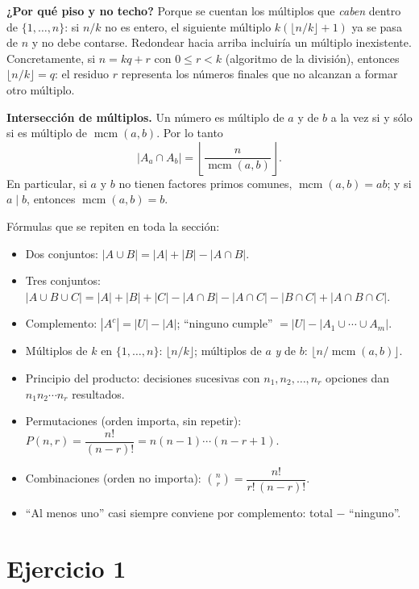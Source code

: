 \documentclass[11pt]{article}
\begin{document}
\begin{teo}
\smallskip
\textbf{¿Por qué piso y no techo?} Porque se cuentan los múltiplos que \emph{caben} dentro de $\{1,\dots,n\}$: si $n/k$ no es entero, el siguiente múltiplo $k(\lfloor n/k\rfloor+1)$ ya se pasa de $n$ y no debe contarse. Redondear hacia arriba incluiría un múltiplo inexistente. Concretamente, si $n = kq+r$ con $0\le r<k$ (algoritmo de la división), entonces $\lfloor n/k\rfloor = q$: el residuo $r$ representa los números finales que no alcanzan a formar otro múltiplo.

\smallskip
\textbf{Intersección de múltiplos.} Un número es múltiplo de $a$ y de $b$ a la vez si y sólo si es múltiplo de $\operatorname{mcm}(a,b)$. Por lo tanto
\[
|A_a\cap A_b| = \left\lfloor \frac{n}{\operatorname{mcm}(a,b)} \right\rfloor .
\]
En particular, si $a$ y $b$ no tienen factores primos comunes, $\operatorname{mcm}(a,b)=ab$; y si $a\mid b$, entonces $\operatorname{mcm}(a,b)=b$.
\end{teo}

\begin{tip}
Fórmulas que se repiten en toda la sección:
\begin{itemize}[leftmargin=1.3em,itemsep=1pt]
\item Dos conjuntos: $|A\cup B| = |A|+|B|-|A\cap B|$.
\item Tres conjuntos: $|A\cup B\cup C| = |A|+|B|+|C|-|A\cap B|-|A\cap C|-|B\cap C|+|A\cap B\cap C|$.
\item Complemento: $|A^c| = |U|-|A|$; ``ninguno cumple'' $=|U|-|A_1\cup\cdots\cup A_m|$.
\item Múltiplos de $k$ en $\{1,\dots,n\}$: $\lfloor n/k\rfloor$; múltiplos de $a$ \emph{y} de $b$: $\lfloor n/\operatorname{mcm}(a,b)\rfloor$.
\item Principio del producto: decisiones sucesivas con $n_1,n_2,\dots,n_r$ opciones dan $n_1 n_2\cdots n_r$ resultados.
\item Permutaciones (orden importa, sin repetir): $P(n,r)=\dfrac{n!}{(n-r)!}=n(n-1)\cdots(n-r+1)$.
\item Combinaciones (orden no importa): $\binom{n}{r}=\dfrac{n!}{r!\,(n-r)!}$.
\item ``Al menos uno'' casi siempre conviene por complemento: total $-$ ``ninguno''.
\end{itemize}
\end{tip}

\section*{Ejercicio 1}
\end{document}
